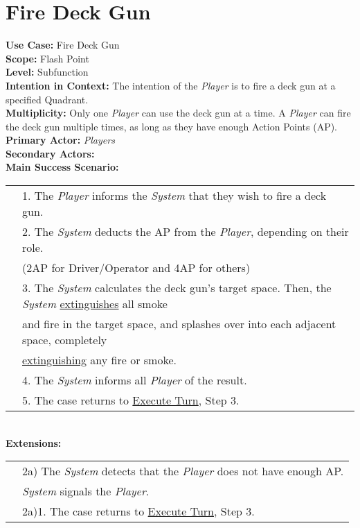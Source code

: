 \documentclass{article}
\begin{document}
	\section*{Fire Deck Gun}
	\textbf{Use Case:} Fire Deck Gun\\
	\textbf{Scope:} Flash Point\\
	\textbf{Level:} Subfunction\\
	\textbf{Intention in Context:} The intention of the \textit{Player} is to fire a deck gun at a specified Quadrant.\\
	\textbf{Multiplicity: }Only one \textit{Player} can use the deck gun at a time. A \textit{Player} can fire the deck gun multiple times, as long as they have enough Action Points (AP).\\
	\textbf{Primary Actor:} \textit{Players}\\
	\textbf{Secondary Actors:}\\
	\textbf{Main Success Scenario:}\\
	\begin{tabular}{l l}
		&1. The \textit{Player} informs the \textit{System} that they wish to fire a deck gun.\\
		&2. The \textit{System} deducts the AP from the \textit{Player}, depending on their role.\\
		&\qquad (2AP for Driver/Operator and 4AP for others)\\
		&3. The \textit{System} calculates the deck gun’s target space. Then, the \textit{System} \underline{extinguishes} all smoke\\
		&\qquad and fire in the target space, and splashes over into each adjacent space, completely\\ &\qquad\underline{extinguishing} any fire or smoke.\\
		&4. The \textit{System} informs all \textit{Player} of the result.\\
		&5. The case returns to \underline{Execute Turn}, Step 3.
	\end{tabular}\\
	\textbf{Extensions:}\\
	\begin{tabular}{l l}
		&2a) The \textit{System} detects that the \textit{Player} does not have enough AP.\\ &\qquad\textit{System} signals the \textit{Player}.\\
		&\qquad2a)1. The case returns to \underline{Execute Turn}, Step 3.\\
	\end{tabular}\\
	
\end{document}
